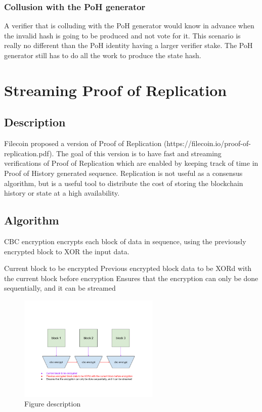 \documentclass[12pt]{article}
\begin{document}
\subsubsection{Collusion with the PoH generator}
A verifier that is colluding with the PoH generator would know in advance when the invalid hash is going to be produced and not vote for it.  This scenario is really no different than the PoH identity having a larger verifier stake.  The PoH generator still has to do all the work to produce the state hash.
\section{Streaming Proof of Replication}
\subsection{Description}
Filecoin proposed a version of Proof of Replication (https://filecoin.io/proof-of-replication.pdf).  The goal of this version is to have fast and streaming verifications of Proof of Replication which are enabled by keeping track of time in Proof of History generated sequence.  Replication is not useful as a consensus algorithm, but is a useful tool to distribute the cost of storing the blockchain history or state at a high availability.
\subsection{Algorithm}
CBC encryption encrypts each block of data in sequence, using the previously encrypted block to XOR the input data.


Current block to be encrypted
Previous encrypted block data to be XORd with the current block before encryption
Ensures that the encryption can only be done sequentially, and it can be streamed

\begin{figure}
  \begin{center}
    \centering
    \includegraphics[width=0.6\textwidth]{figures/fig_7.png}
    \caption[Fig 7]{Figure description \label{fig_7}}
  \end{center}
  \end{figure}
\end{document}

